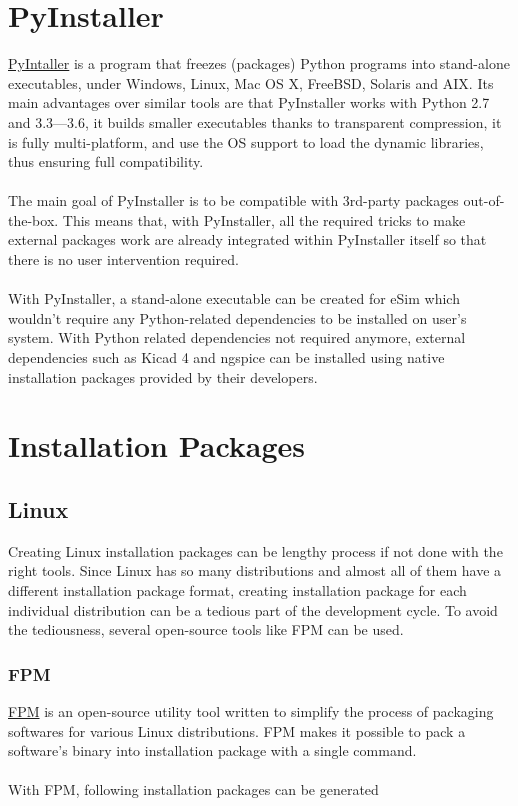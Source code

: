 \documentclass[12pt,a4paper]{report}
\begin{document}
\section{PyInstaller}
\href{http://www.pyinstaller.org/}{PyIntaller} is a program that freezes (packages) Python programs into stand-alone executables, under Windows, Linux, Mac OS X, FreeBSD, Solaris and AIX. Its main advantages over similar tools are that PyInstaller works with Python 2.7 and 3.3—3.6, it builds smaller executables thanks to transparent compression, it is fully multi-platform, and use the OS support to load the dynamic libraries, thus ensuring full compatibility.\\
\\
The main goal of PyInstaller is to be compatible with 3rd-party packages out-of-the-box. This means that, with PyInstaller, all the required tricks to make external packages work are already integrated within PyInstaller itself so that there is no user intervention required.\\
\\
With PyInstaller, a stand-alone executable can be created for eSim which wouldn't require any Python-related dependencies to be installed on user's system. With Python related dependencies not required anymore, external dependencies such as Kicad 4 and ngspice can be installed using native installation packages provided by their developers.
\section{Installation Packages}
\subsection{Linux}
Creating Linux installation packages can be lengthy process if not done with the right tools. Since Linux has so many distributions and almost all of them have a different installation package format, creating installation package for each individual distribution can be a tedious part of the development cycle. To avoid the tediousness, several open-source tools like FPM can be used.
\subsubsection{FPM}
\href{https://github.com/jordansissel/fpm}{FPM} is an open-source utility tool written to simplify the process of packaging softwares for various Linux distributions. FPM makes it possible to pack a software's binary into installation package with a single command.\\
\\
With FPM, following installation packages can be generated
\end{document}
